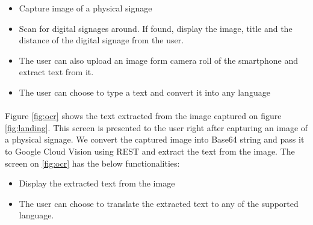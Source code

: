 \documentclass[12pt]{article}
\begin{document}
\begin{itemize}
	\item Capture image of a physical signage
	\item Scan for digital signages around. If found, display the image, title and the distance of the digital signage from the user.
	\item The user can also upload an image form camera roll of the smartphone and extract text from it. 
	\item The user can choose to type a text and convert it into any language
\end{itemize}


\paragraph{}Figure \ref{fig:ocr} shows the text extracted from the image captured on figure \ref{fig:landing}. This screen is presented to the user right after capturing an image of a physical signage. We convert the captured image into Base64 string and pass it to Google Cloud Vision using REST and extract the text from the image. The screen on  \ref{fig:ocr} has the below functionalities: 

\begin{itemize}
	\item Display the extracted text from the image
	\item The user can choose to translate the extracted text to any of the supported language. 
\end{itemize}
\end{document}
